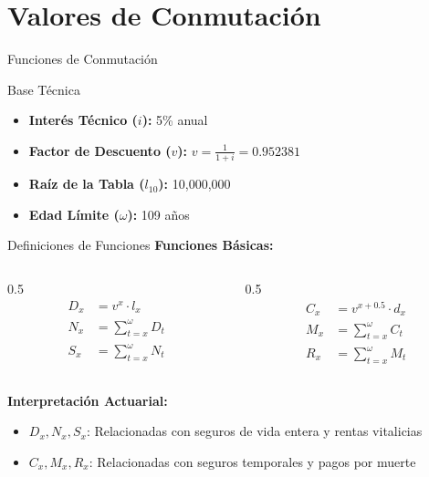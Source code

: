\section{Valores de Conmutación}

\begin{frame}{Funciones de Conmutación}
  \begin{block}{Base Técnica}
    \begin{itemize}
      \item \textbf{Interés Técnico ($i$):} 5\% anual
      \item \textbf{Factor de Descuento ($v$):} $v = \frac{1}{1+i} = 0.952381$
      \item \textbf{Raíz de la Tabla ($l_{10}$):} 10,000,000
      \item \textbf{Edad Límite ($\omega$):} 109 años
    \end{itemize}
  \end{block}
\end{frame}

\begin{frame}{Definiciones de Funciones}
  \textbf{Funciones Básicas:}
  \begin{columns}
    \begin{column}{0.5\textwidth}
      \begin{align*}
        D_x &= v^x \cdot l_x \\
        N_x &= \sum_{t=x}^{\omega} D_t \\
        S_x &= \sum_{t=x}^{\omega} N_t
      \end{align*}
    \end{column}
    \begin{column}{0.5\textwidth}
      \begin{align*}
        C_x &= v^{x+0.5} \cdot d_x \\
        M_x &= \sum_{t=x}^{\omega} C_t \\
        R_x &= \sum_{t=x}^{\omega} M_t
      \end{align*}
    \end{column}
  \end{columns}
  
  \vspace{0.5cm}
  
  \textbf{Interpretación Actuarial:}
  \begin{itemize}
    \item $D_x, N_x, S_x$: Relacionadas con seguros de vida entera y rentas vitalicias
    \item $C_x, M_x, R_x$: Relacionadas con seguros temporales y pagos por muerte
  \end{itemize}
\end{frame}

